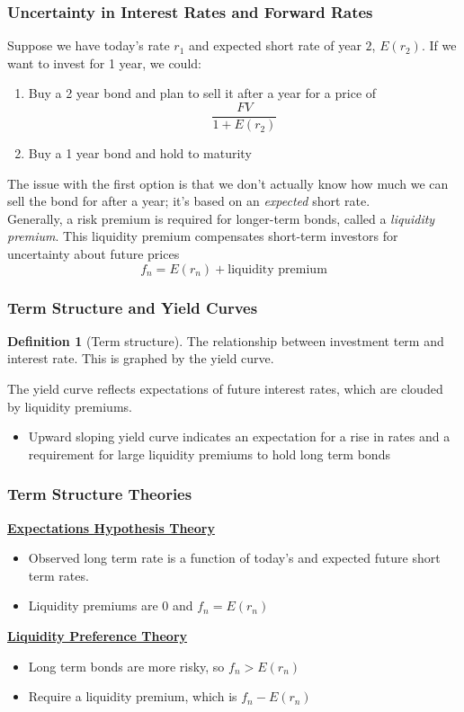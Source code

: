 \documentclass[11pt]{article}
\theoremstyle{definition}
\newtheorem*{definition}{Definition}
\begin{document}
\subsubsection{Uncertainty in Interest Rates and Forward Rates}
Suppose we have today's rate $r_1$ and expected short rate of year $2$, $E(r_2)$. If we want to invest for 1 year, we could:
\begin{enumerate}
    \item Buy a 2 year bond and plan to sell it after a year for a price of 
    \begin{equation*}
        \frac{FV}{1 + E(r_2)}
    \end{equation*}
    \item Buy a 1 year bond and hold to maturity
\end{enumerate}
The issue with the first option is that we don't actually know how much we can sell the bond for after a year; it's based on an \textit{expected} short rate.\\
Generally, a risk premium is required for longer-term bonds, called a \textit{liquidity premium}. This liquidity premium compensates short-term investors for uncertainty about future prices
\begin{equation*}
    f_n = E(r_n)  + \text{liquidity premium}
\end{equation*}

\subsubsection{Term Structure and Yield Curves}
\begin{definition}[Term structure]
    The relationship between investment term and interest rate. This is graphed by the yield curve. 
\end{definition}
The yield curve reflects expectations of future interest rates, which are clouded by liquidity premiums.
\begin{itemize}
    \item Upward sloping yield curve indicates an expectation for a rise in rates and a requirement for large liquidity premiums to hold long term bonds
\end{itemize}

\subsubsection{Term Structure Theories}
\textbf{\underline{Expectations Hypothesis Theory}}
\begin{itemize}
    \item Observed long term rate is a function of today's and expected future short term rates.
    \item Liquidity premiums are $0$ and $f_n = E(r_n)$
\end{itemize}
\textbf{\underline{Liquidity Preference Theory}}
\begin{itemize}
    \item Long term bonds are more risky, so $f_n > E(r_n)$
    \item Require a liquidity premium, which is $f_n - E(r_n)$
\end{itemize}
\end{document}
